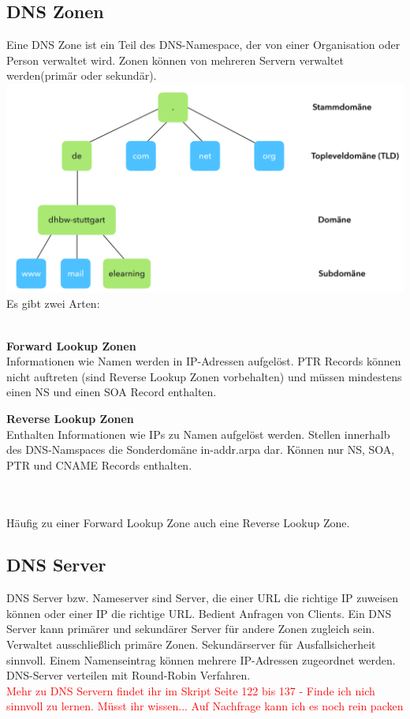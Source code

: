 \documentclass[12pt,a4paper]{article}
\begin{document}
\subsection{DNS Zonen}
Eine DNS Zone ist ein Teil des DNS-Namespace, der von einer Organisation oder Person verwaltet wird. Zonen können von mehreren Servern verwaltet werden(primär oder sekundär).\\
\includegraphics[width=\textwidth]{Bilder/Zone.PNG}
Es gibt zwei Arten:\\\\
\begin{minipage}{.45\textwidth}
	\textbf{Forward Lookup Zonen}\\
	Informationen wie Namen werden in IP-Adressen aufgelöst. PTR Records können nicht auftreten (sind Reverse Lookup Zonen vorbehalten) und müssen mindestens einen NS und einen SOA Record enthalten.
\end{minipage}
\hspace{.1\textwidth}
\begin{minipage}{.45\textwidth}
	\textbf{Reverse Lookup Zonen}\\
	Enthalten Informationen wie IPs zu Namen aufgelöst werden. Stellen innerhalb des DNS-Namspaces die Sonderdomäne in-addr.arpa dar. Können nur NS, SOA, PTR und CNAME Records enthalten.
\end{minipage}\\
\vspace{.5cm}\\
Häufig zu einer Forward Lookup Zone auch eine Reverse Lookup Zone.

\subsection{DNS Server}
DNS Server bzw. Nameserver sind Server, die einer URL die richtige IP zuweisen können oder einer IP die richtige URL. Bedient Anfragen von Clients. Ein DNS Server kann primärer und sekundärer Server für andere Zonen zugleich sein. Verwaltet ausschließlich primäre Zonen. Sekundärserver für Ausfallsicherheit sinnvoll. Einem Namenseintrag können mehrere IP-Adressen zugeordnet werden. DNS-Server verteilen mit Round-Robin Verfahren.\\
\textcolor{red}{Mehr zu DNS Servern findet ihr im Skript Seite 122 bis 137 - Finde ich nich sinnvoll zu lernen. Müsst ihr wissen... Auf Nachfrage kann ich es noch rein packen}
\end{document}
